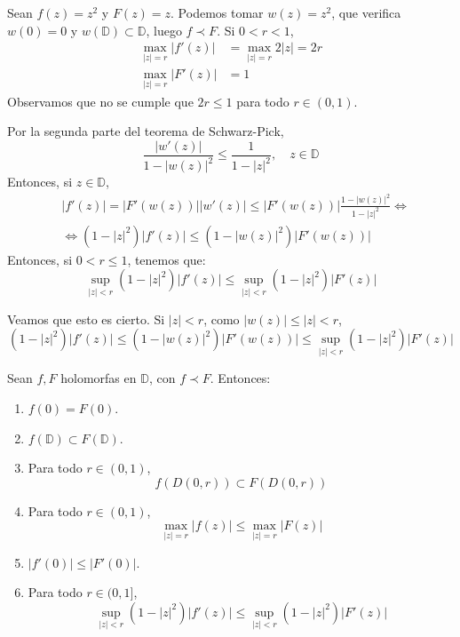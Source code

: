 \begin{example}[Contraejemplo]
    Sean $f(z) = z^2$ y $F(z) = z$.
    Podemos tomar $w(z) = z^2$, que verifica $w(0) = 0$ y $w(\mathbb{D}) \subset \mathbb{D}$, luego $f \prec F$.
    Si $0 < r < 1$,
    \begin{align*}
        \max_{|z|=r} |f'(z)| & = \max_{|z|=r} 2|z| = 2r \\
        \max_{|z|=r} |F'(z)| & = 1
    \end{align*}
    Observamos que no se cumple que $2r \leq 1$ para todo $r \in (0, 1)$.
\end{example}

Por la segunda parte del teorema de Schwarz-Pick,
$$\frac{|w'(z)|}{1-|w(z)|^2} \leq \frac{1}{1-|z|^2}, \quad z \in \mathbb{D}$$
Entonces, si $z \in \mathbb{D}$,
\begin{align*}
     & |f'(z)| = |F'(w(z))||w'(z)| \leq |F'(w(z))|\frac{1-|w(z)|^2}{1-|z|^2} \Leftrightarrow \\
     & \Leftrightarrow (1-|z|^2)|f'(z)| \leq (1-|w(z)|^2)|F'(w(z))|
\end{align*}
Entonces, si $0 < r \leq 1$, tenemos que:
$$\sup_{|z|<r} (1-|z|^2)|f'(z)| \leq \sup_{|z|<r} (1-|z|^2)|F'(z)|$$

Veamos que esto es cierto.
Si $|z| < r$, como $|w(z)| \leq |z| < r$,
$$(1-|z|^2)|f'(z)| \leq (1-|w(z)|^2)|F'(w(z))| \leq \sup_{|z|<r} (1-|z|^2)|F'(z)|$$

\begin{proposition}
    Sean $f, F$ holomorfas en $\mathbb{D}$, con $f \prec F$.
    Entonces:
    \begin{enumerate}
        \item $f(0) = F(0)$.
        \item $f(\mathbb{D}) \subset F(\mathbb{D})$.
        \item Para todo $r \in (0, 1)$,
              $$f(D(0, r)) \subset F(D(0, r))$$
        \item Para todo $r \in (0, 1)$,
              $$\max_{|z|=r} |f(z)| \leq \max_{|z|=r} |F(z)|$$
        \item $|f'(0)| \leq |F'(0)|$.
        \item Para todo $r \in (0, 1]$,
              $$\sup_{|z|<r} (1-|z|^2)|f'(z)| \leq \sup_{|z|<r} (1-|z|^2)|F'(z)|$$
    \end{enumerate}
\end{proposition}